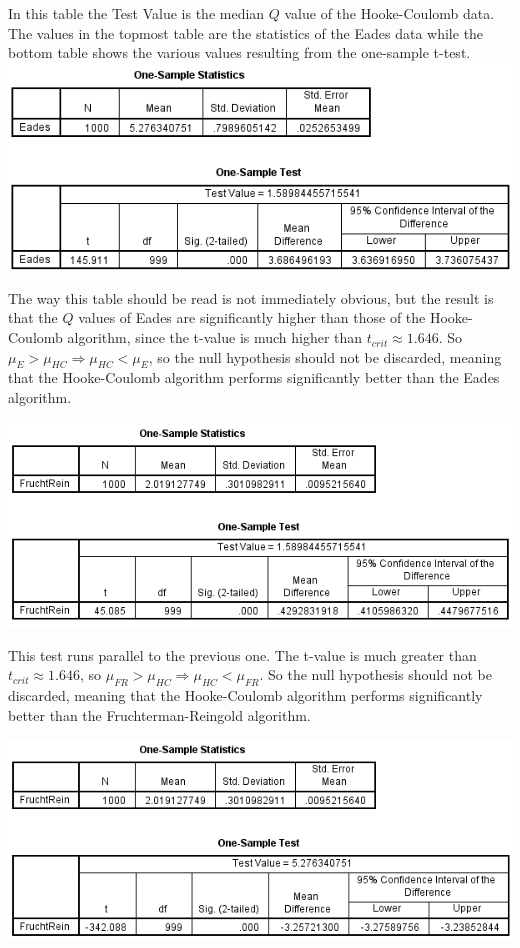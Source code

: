 \documentclass[a4paper,12pt]{article}
\begin{document}
  In this table the Test Value is the median $Q$ value of the Hooke-Coulomb data. The values in the topmost table are the statistics of the Eades data while the bottom table shows the various values resulting from the one-sample t-test.
  \includegraphics{HookeEadesTest}
  
  The way this table should be read is not immediately obvious, but the result is that the $Q$ values of Eades are significantly higher than those of the Hooke-Coulomb algorithm, since the t-value is much higher than $t_{crit} \approx 1.646$. So $\mu_{E} > \mu_{HC} \Rightarrow \mu_{HC} < \mu_{E}$, so the null hypothesis should not be discarded, meaning that the Hooke-Coulomb algorithm performs significantly better than the Eades algorithm.
  
  \includegraphics{HookeFRTest}
  
  This test runs parallel to the previous one. The t-value is much greater than $t_{crit} \approx 1.646$, so $\mu_{FR} > \mu_{HC} \Rightarrow \mu_{HC} < \mu_{FR}$. So the null hypothesis should not be discarded, meaning that the Hooke-Coulomb algorithm performs significantly better than the Fruchterman-Reingold algorithm.
  
  \includegraphics{EadesFRTest}
  
\end{document}
